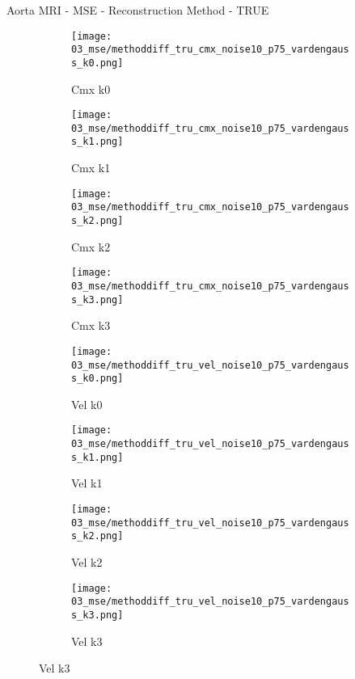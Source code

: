 \documentclass{beamer}
\begin{document}
\begin{frame}{Aorta MRI - MSE - Reconstruction Method - TRUE}{}
\begin{figure}
\begin{subfigure}{0.24\textwidth}
\texttt{[image: 03\_mse/methoddiff\_tru\_cmx\_noise10\_p75\_vardengauss\_k0.png]}
\vspace{-20pt}
\caption*{\tiny Cmx k0}
\end{subfigure}
\begin{subfigure}{0.24\textwidth}
\texttt{[image: 03\_mse/methoddiff\_tru\_cmx\_noise10\_p75\_vardengauss\_k1.png]}
\vspace{-20pt}
\caption*{\tiny Cmx k1}
\end{subfigure}
\begin{subfigure}{0.24\textwidth}
\texttt{[image: 03\_mse/methoddiff\_tru\_cmx\_noise10\_p75\_vardengauss\_k2.png]}
\vspace{-20pt}
\caption*{\tiny Cmx k2}
\end{subfigure}
\begin{subfigure}{0.24\textwidth}
\texttt{[image: 03\_mse/methoddiff\_tru\_cmx\_noise10\_p75\_vardengauss\_k3.png]}
\vspace{-20pt}
\caption*{\tiny Cmx k3}
\end{subfigure}

\begin{subfigure}{0.24\textwidth}
\texttt{[image: 03\_mse/methoddiff\_tru\_vel\_noise10\_p75\_vardengauss\_k0.png]}
\vspace{-20pt}
\caption*{\tiny Vel k0}
\end{subfigure}
\begin{subfigure}{0.24\textwidth}
\texttt{[image: 03\_mse/methoddiff\_tru\_vel\_noise10\_p75\_vardengauss\_k1.png]}
\vspace{-20pt}
\caption*{\tiny Vel k1}
\end{subfigure}
\begin{subfigure}{0.24\textwidth}
\texttt{[image: 03\_mse/methoddiff\_tru\_vel\_noise10\_p75\_vardengauss\_k2.png]}
\vspace{-20pt}
\caption*{\tiny Vel k2}
\end{subfigure}
\begin{subfigure}{0.24\textwidth}
\texttt{[image: 03\_mse/methoddiff\_tru\_vel\_noise10\_p75\_vardengauss\_k3.png]}
\vspace{-20pt}
\caption*{\tiny Vel k3}
\end{subfigure}
\end{figure}
\end{frame}
\end{document}
